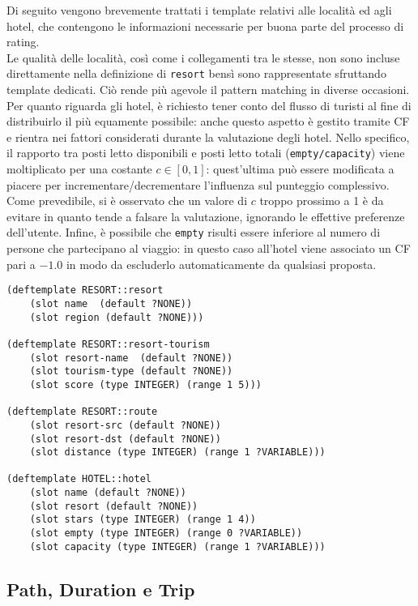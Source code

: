 Di seguito vengono brevemente trattati i template relativi alle località ed agli hotel, che contengono le informazioni necessarie per buona parte del processo di rating.\\
Le qualità delle località, così come i collegamenti tra le stesse, non sono incluse direttamente nella definizione di \texttt{resort} bensì sono rappresentate sfruttando template dedicati. Ciò rende più agevole il pattern matching in diverse occasioni. \\
Per quanto riguarda gli hotel, è richiesto tener conto del flusso di turisti al fine di distribuirlo il più equamente possibile: anche questo aspetto è gestito tramite CF e rientra nei fattori considerati durante la valutazione degli hotel. Nello specifico, il rapporto tra posti letto disponibili e posti letto totali (\texttt{empty/capacity}) viene moltiplicato per una costante $c \in [0,1]$: quest'ultima può essere modificata a piacere per incrementare/decrementare l'influenza sul punteggio complessivo. Come prevedibile, si è osservato che un valore di $c$ troppo prossimo a 1 è da evitare in quanto tende a falsare la valutazione, ignorando le effettive preferenze dell'utente.
Infine, è possibile che \texttt{empty} risulti essere inferiore al numero di persone che partecipano al viaggio: in questo caso all'hotel viene associato un CF pari a $-1.0$ in modo da escluderlo automaticamente da qualsiasi proposta.

\begin{lstlisting}[frame=single]
(deftemplate RESORT::resort
    (slot name  (default ?NONE))
    (slot region (default ?NONE)))
  
(deftemplate RESORT::resort-tourism
    (slot resort-name  (default ?NONE))
    (slot tourism-type (default ?NONE))
    (slot score (type INTEGER) (range 1 5))) 
  
(deftemplate RESORT::route
    (slot resort-src (default ?NONE))
    (slot resort-dst (default ?NONE))
    (slot distance (type INTEGER) (range 1 ?VARIABLE)))
    
(deftemplate HOTEL::hotel
    (slot name (default ?NONE))
    (slot resort (default ?NONE))
    (slot stars (type INTEGER) (range 1 4))
    (slot empty (type INTEGER) (range 0 ?VARIABLE))
    (slot capacity (type INTEGER) (range 1 ?VARIABLE)))
\end{lstlisting} 

\subsection{Path, Duration e Trip}

